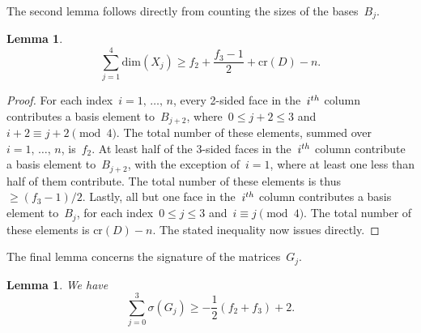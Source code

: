 \documentclass[10pt,a4paper]{amsart}
\numberwithin{equation}{section}
\newcommand{\rcr}{\mathrm{cr}}
\newcommand{\rdim}{\mathrm{dim}}
\newtheorem{lemm}[theo]{Lemma}
\begin{document}
The second lemma follows directly from counting the sizes of the bases~$B_j$.

\begin{lemm}\label{dimension_lem}
\[
\sum_{j=1}^4 \rdim (X_j) \ge f_2 + \frac{f_3-1}{2} + \rcr (D) - n.
\]
\end{lemm}

\begin{proof}
For each index~$i=1,\,\dots,\,n$, every 2-sided face in the~$i^{\rm th}$ column contributes a basis element to~$B_{j+2}$, where~$0 \le j+2 \le 3$ and~$i+2 \equiv j+2 \pmod 4$. The total number of these elements, summed over~$i=1,\,\dots,\,n$, is~$f_2$. At least half of the 3-sided faces in the~$i^{\rm th}$ column contribute a basis element to~$B_{j+2}$, with the exception of~$i=1$, where at least one less than half of them contribute. The total number of these elements is thus~$\ge (f_3-1)/2$. Lastly, all but one face in the~$i^{\rm th}$ column contributes a basis element to~$B_j$, for each index~$0 \le j \le 3$ and~$i \equiv j \pmod 4$. The total number of these elements is $\rcr (D)-n$. The stated inequality now issues directly.
\end{proof}

The final lemma concerns the signature of the matrices~$G_j$.

\begin{lemm}\label{signature_lem}
We have
\[
\sum_{j=0}^3 \sigma(G_j) \ge -\frac{1}{2}(f_2 + f_3) + 2.
\]
\end{lemm}
\end{document}
